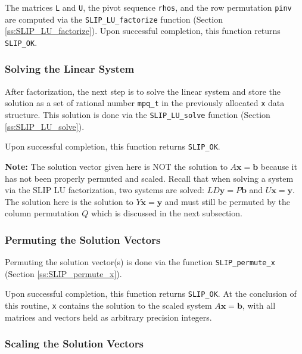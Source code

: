 \documentclass[12pt]{article}
\theoremstyle{definition}
\begin{document}
The matrices \verb|L| and \verb|U|, the pivot sequence \verb|rhos|, and the row
permutation \verb|pinv| are computed via the \verb|SLIP_LU_factorize| function
(Section \ref{ss:SLIP_LU_factorize}).  Upon successful completion, this
function returns \verb|SLIP_OK|.

\subsubsection{Solving the Linear System}

After factorization, the next step is to solve the linear system and store the
solution as a set of rational number \verb|mpq_t| in the previously allocated
\verb|x| data structure. This solution is done via the \verb|SLIP_LU_solve|
function (Section \ref{ss:SLIP_LU_solve}).

Upon successful completion, this function returns \verb|SLIP_OK|.

\textbf{Note:} The solution vector given here is NOT the solution to $A
\mathbf{x} = \mathbf{b}$ because it has not been properly permuted and scaled.
Recall that when solving a system via the SLIP LU factorization, two systems
are solved: $LD \mathbf{y} = P \mathbf{b}$ and $U \mathbf{x} = \mathbf{y}$. The
solution here is the solution to $Y \mathbf{x} = \mathbf{y}$ and must still be
permuted by the column permutation $Q$ which is discussed in the next
subsection.

\subsubsection{Permuting the Solution Vectors}

Permuting the solution vector(s) is done via the function \verb|SLIP_permute_x|
(Section \ref{ss:SLIP_permute_x}).

Upon successful completion, this function returns \verb|SLIP_OK|. At the
conclusion of this routine, \verb|x| contains the solution to the scaled system
$A \mathbf{x} = \mathbf{b}$, with all matrices and vectors held as arbitrary
precision integers.

\subsubsection{Scaling the Solution Vectors}
\end{document}
